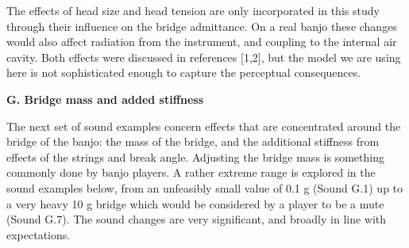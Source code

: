 





  The effects of head size and head tension are only incorporated in this study 
  through their influence on the bridge admittance. On a real banjo these 
  changes would also affect radiation from the instrument, and coupling to the 
  internal air cavity. Both effects were discussed in references [1,2], but the 
  model we are using here is not sophisticated enough to capture the perceptual 
  consequences. 

  \textbf{G. Bridge mass and added stiffness} 

  The next set of sound examples concern effects that are concentrated around 
  the bridge of the banjo: the mass of the bridge, and the additional stiffness 
  from effects of the strings and break angle. Adjusting the bridge mass is 
  something commonly done by banjo players. A rather extreme range is explored 
  in the sound examples below, from an unfeasibly small value of 0.1 g (Sound 
  G.1) up to a very heavy 10 g bridge which would be considered by a player to 
  be a mute (Sound G.7). The sound changes are very significant, and broadly in 
  line with expectations. 



